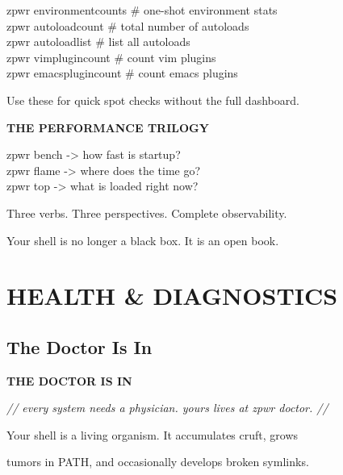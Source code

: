 \documentclass[11pt,a4paper,twoside]{book}
\begin{document}
\begin{codebox}
zpwr environmentcounts   \# one-shot environment stats\\
zpwr autoloadcount       \# total number of autoloads\\
zpwr autoloadlist        \# list all autoloads\\
zpwr vimplugincount      \# count vim plugins\\
zpwr emacsplugincount    \# count emacs plugins\\
\end{codebox}

Use these for quick spot checks without the full dashboard.


\vspace{12pt}
{\bfseries\color{neonyellow} THE PERFORMANCE TRILOGY}\vspace{4pt}

\begin{codebox}
zpwr bench  -> how fast is startup?\\
zpwr flame  -> where does the time go?\\
zpwr top    -> what is loaded right now?\\
\end{codebox}

Three verbs. Three perspectives. Complete observability.

Your shell is no longer a black box. It is an open book.


\vspace{16pt}


\chapter{HEALTH \& DIAGNOSTICS}

\section{The Doctor Is In}


\vspace{10pt}
{\large\bfseries\color{neoncyan} THE DOCTOR IS IN}\vspace{6pt}

{\small\itshape\color{dimtext} // every system needs a physician. yours lives at zpwr doctor. //}

Your shell is a living organism. It accumulates cruft, grows

tumors in PATH, and occasionally develops broken symlinks.
\end{document}
